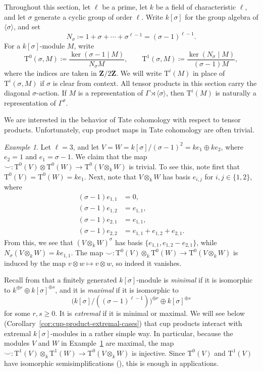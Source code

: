 \documentclass[reqno]{amsart}
\numberwithin{equation}{subsection}
\newcommand{\Z}{\mathbf{Z}}
\newcommand{\co}{\colon}
\newcommand{\rT}{\ensuremath{\mathrm{T}}\xspace}
\theoremstyle{remark}
\newtheorem{example}[thm]{Example}
\numberwithin{equation}{subsection}
\numberwithin{figure}{subsection}
\begin{document}
Throughout this section, let $\ell$ be a prime, let $k$ be a field of characteristic $\ell$, and let $\sigma$ generate a cyclic group of order $\ell$. Write $k[\sigma]$ for the group algebra of $\langle\sigma\rangle$, and set
\[
N_\sigma \coloneqq 1+\sigma+\cdots+\sigma^{\ell-1}=(\sigma-1)^{\ell-1}.
\]
For a $k[\sigma]$-module $M$, write
\[
\rT^0(\sigma, M)\coloneqq\frac{\ker(\sigma-1\mid M)}{N_\sigma M},
\qquad
\rT^1(\sigma, M)\coloneqq\frac{\ker(N_\sigma\mid M)}{(\sigma-1)M},
\]
where the indices are taken in $\Z/2\Z$. We will write $\rT^i(M)$ in place of $\rT^i(\sigma, M)$ if $\sigma$ is clear from context. All tensor products in this section carry the diagonal $\sigma$-action. If $M$ is a representation of $\Gamma\rtimes\langle\sigma\rangle$, then $\rT^i(M)$ is naturally a representation of $\Gamma^\sigma$.

We are interested in the behavior of Tate cohomology with respect to tensor products. Unfortunately, cup product maps in Tate cohomology are often trivial.

\begin{example}\label{ex:vanishing-cup-product}
Let $\ell = 3$, and let $V = W = k[\sigma]/(\sigma-1)^2 = ke_1 \oplus ke_2$, where $e_2 = 1$ and $e_1 = \sigma - 1$. We claim that the map $\smile\co \rT^0(V) \otimes \rT^0(W) \to \rT^0(V \otimes_k W)$ is trivial. To see this, note first that $\rT^0(V) = \rT^0(W) = ke_1$. Next, note that $V \otimes_k W$ has basis $e_{i,j}$ for $i,j \in \{1,2\}$, where
\[
\begin{aligned}
    (\sigma-1)e_{1,1} &=0,\\
    (\sigma-1)e_{1,2} &=e_{1,1},\\
    (\sigma-1)e_{2,1} &=e_{1,1},\\
    (\sigma-1)e_{2,2} &=e_{1,1} + e_{1,2} + e_{2,1}.
\end{aligned}
\]
From this, we see that $(V \otimes_k W)^\sigma$ has basis $\{e_{1,1}, e_{1,2} - e_{2,1}\}$, while $N_\sigma(V \otimes_k W) = ke_{1,1}$. The map $\smile\co \rT^0(V) \otimes_k \rT^0(W) \to \rT^0(V \otimes_k W)$ is induced by the map $v \otimes w \mapsto v \otimes w$, so indeed it vanishes.
\end{example}

Recall from \cite[Definition~3.5.3]{Cot26b} that a finitely generated $k[\sigma]$-module is \emph{minimal} if it is isomorphic to $k^{\oplus r}\oplus k[\sigma]^{\oplus s}$, and it is \emph{maximal} if it is isomorphic to
\[
\bigl(k[\sigma]/((\sigma-1)^{\ell-1})\bigr)^{\oplus r}\oplus k[\sigma]^{\oplus s}
\]
for some $r,s\geq0$. It is \emph{extremal} if it is minimal or maximal. We will see below (Corollary~\ref{cor:cup-product-extremal-cases}) that cup products interact with extremal $k[\sigma]$-modules in a rather simple way. In particular, because the modules $V$ and $W$ in Example~\ref{ex:vanishing-cup-product} are maximal, the map $\smile\co \rT^1(V) \otimes_k \rT^1(W) \to \rT^0(V \otimes_k W)$ is injective. Since $\rT^0(V)$ and $\rT^1(V)$ have isomorphic semisimplifications (\cite[Lemma~3.1.2]{Cot26b}), this is enough in applications.
\end{document}
